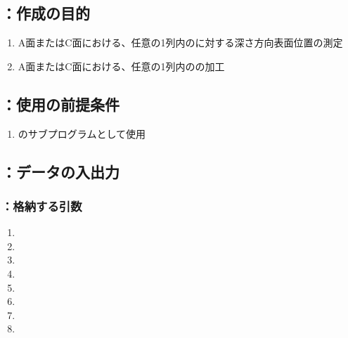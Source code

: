 \subsection{\DLtwoAC：作成の目的}
\begin{enumerate}[label*=\sarrow]
\item A面またはC面における、任意の1列内の\Dimple に対する深さ方向表面位置の測定
\item A面またはC面における、任意の1列内の\Dimple の加工
\end{enumerate}


\subsection{\DLtwoAC：使用の前提条件}
\begin{enumerate}[label*=\sarrow]
\item \DLone のサブプログラムとして使用
\end{enumerate}


\subsection{\DLtwoAC：データの入出力}

\subsubsection{\DLtwoAC：格納する引数}
\begin{enumerate}[label*=\sarrow]
\item \PMACFaceSelectionFlag
\item \PMDimpleAngle
\item \PMDimpleHorizontalPitch
\item \PMDimpleOddRowLength
\item \PMDimpleEvenRowLength
\item \PMDimpleRowNum
\item \PMDimpleDepth
\item \PMTopEndACIDMeasuredValue
\end{enumerate}

